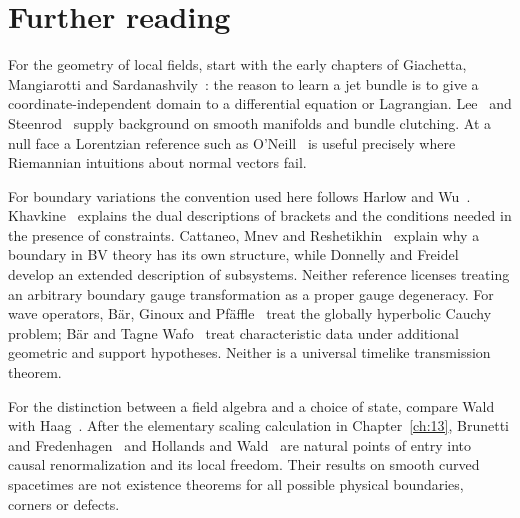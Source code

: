 \chapter*{Further reading}
For the geometry of local fields, start with the early chapters of Giachetta, Mangiarotti and Sardanashvily~\cite{GMS}: the reason to learn a jet bundle is to give a coordinate-independent domain to a differential equation or Lagrangian. Lee~\cite{Lee} and Steenrod~\cite{Steenrod} supply background on smooth manifolds and bundle clutching. At a null face a Lorentzian reference such as O'Neill~\cite{ON} is useful precisely where Riemannian intuitions about normal vectors fail.

For boundary variations the convention used here follows Harlow and Wu~\cite{HW}. Khavkine~\cite{Khavkine} explains the dual descriptions of brackets and the conditions needed in the presence of constraints. Cattaneo, Mnev and Reshetikhin~\cite{CMR} explain why a boundary in BV theory has its own structure, while Donnelly and Freidel~\cite{DF} develop an extended description of subsystems. Neither reference licenses treating an arbitrary boundary gauge transformation as a proper gauge degeneracy. For wave operators, B\"ar, Ginoux and Pf\"affle~\cite{BGP} treat the globally hyperbolic Cauchy problem; B\"ar and Tagne Wafo~\cite{BW} treat characteristic data under additional geometric and support hypotheses. Neither is a universal timelike transmission theorem.

For the distinction between a field algebra and a choice of state, compare Wald~\cite{WaldQFT} with Haag~\cite{Haag}. After the elementary scaling calculation in Chapter~\ref{ch:13}, Brunetti and Fredenhagen~\cite{BF} and Hollands and Wald~\cite{HWick,HWT} are natural points of entry into causal renormalization and its local freedom. Their results on smooth curved spacetimes are not existence theorems for all possible physical boundaries, corners or defects.

